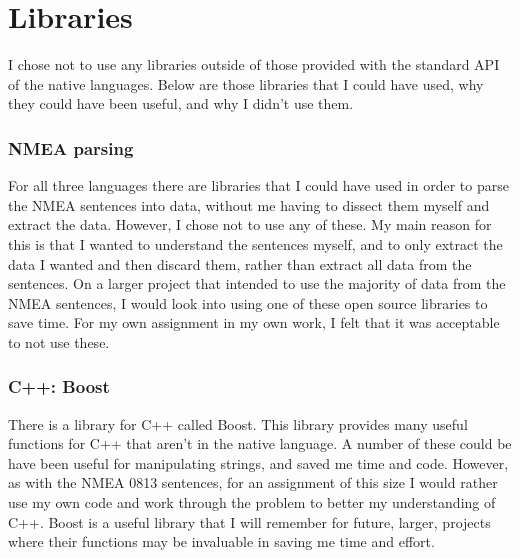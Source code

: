 \documentclass{article}
\begin{document}




\section{Libraries}

I chose not to use any libraries outside of those provided with the standard API of the native languages. Below are those libraries that I could have used, why they could have been useful, and why I didn't use them.

\subsubsection{NMEA parsing}
For all three languages there are libraries that I could have used in order to parse the NMEA sentences into data, without me having to dissect them myself and extract the data\cite{nmeajava}\cite{nmeacplusplus}. However, I chose not to use any of these. My main reason for this is that I wanted to understand the sentences myself, and to only extract the data I wanted and then discard them, rather than extract all data from the sentences. On a larger project that intended to use the majority of data from the NMEA sentences, I would look into using one of these open source libraries to save time. For my own assignment in my own work, I felt that it was acceptable to not use these.

\subsubsection{C++: Boost}
There is a library for C++ called Boost\cite{boost}. This library provides many useful functions for C++ that aren't in the native language. A number of these could be have been useful for manipulating strings, and saved me time and code. However, as with the NMEA 0813 sentences, for an assignment of this size I would rather use my own code and work through the problem to better my understanding of C++. Boost is a useful library that I will remember for future, larger, projects where their functions may be invaluable in saving me time and effort.
\end{document}
